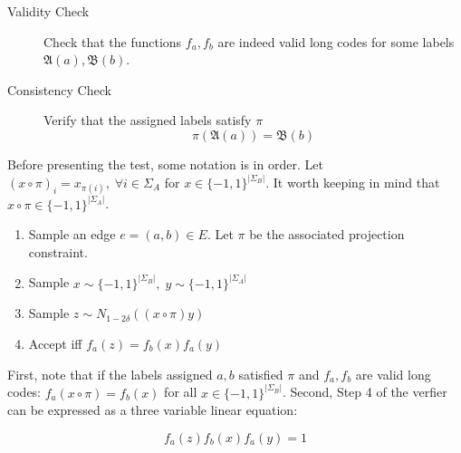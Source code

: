 \begin{description}
  \item[Validity Check] Check that the functions $f_a,f_b$ are indeed valid long codes for some labels $\mathfrak{A}(a),\mathfrak{B}(b)$.
  \item[Consistency Check] Verify that the assigned labels satisfy $\pi$
  \[ \pi(\mathfrak{A}(a)) =  \mathfrak{B}(b)\]
\end{description}

Before presenting the test, some notation is in order. Let $(x \circ \pi)_i = x_{\pi(i)}, \; \forall i \in \Sigma_A$ for $x \in \{-1,1\}^{|\Sigma_B|}$. It worth keeping in mind that $x \circ \pi \in \{-1,1\}^{|\Sigma_A|}$.

\begin{enumerate}
  \item Sample an edge $e = (a,b) \in E$. Let $\pi$ be the associated projection constraint.

  \item Sample $x \sim \{-1,1\}^{|\Sigma_B|}, \; y \sim \{-1,1\}^{|\Sigma_A|}$
  \item Sample $z \sim N_{1 - 2\delta}((x \circ \pi)y)$
  \item Accept iff $f_a(z) = f_b(x)f_a(y)$
\end{enumerate}

First, note that if the labels assigned $a,b$ satisfied $\pi$ and $f_a,f_b$ are valid long codes: $f_a(x \circ \pi) = f_b(x )$ for all $x \in \{-1,1\}^{|\Sigma_B|}$. Second, Step 4 of the verfier can be expressed as a three variable linear equation:

\begin{equation} \label{hastadpred}
 f_a(z) f_b(x)f_a(y) = 1
\end{equation}

